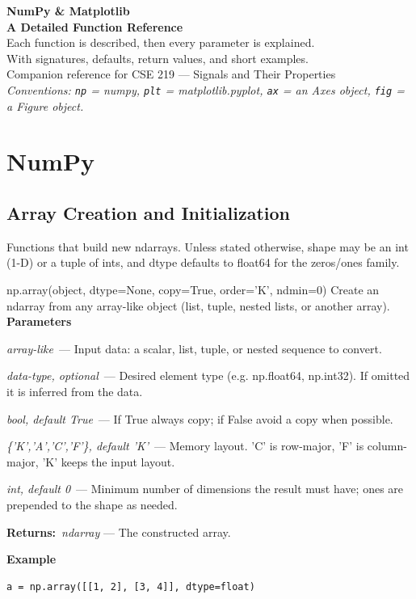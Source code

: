 \documentclass[10pt]{article}
\newenvironment{params}
  {\smallskip\textbf{\small\color{accent}Parameters}\par\nopagebreak
   \begin{description}[leftmargin=1.3em,itemsep=1.5pt,parsep=0pt,topsep=1pt,
      labelindent=0pt,style=sameline,font=\normalfont]}
  {\end{description}}
\newcommand{\pitem}[3]{\item[{\ttfamily\color{accent}#1}]{\itshape #2}\ --- #3}
\newcommand{\preturn}[2]{\smallskip\textbf{\small\color{accent}Returns:}\ {\itshape #1} --- #2\par}
\begin{document}
\begin{titlepage}
\centering
\vspace*{3cm}
{\Huge\bfseries\color{accent} NumPy \& Matplotlib}\\[6pt]
{\LARGE\bfseries A Detailed Function Reference}\\[10pt]
{\large Each function is described, then every parameter is explained.}\\[4pt]
{\normalsize With signatures, defaults, return values, and short examples.}\\[2cm]
{\small Companion reference for CSE 219 --- Signals and Their Properties}\\
\vfill
{\small\itshape Conventions: \texttt{np} = numpy, \texttt{plt} = matplotlib.pyplot,
\texttt{ax} = an Axes object, \texttt{fig} = a Figure object.}
\end{titlepage}

\tableofcontents
\clearpage

\section{NumPy}
\subsection{Array Creation and Initialization}
Functions that build new ndarrays. Unless stated otherwise, shape may be an int (1-D) or a tuple of ints, and dtype defaults to float64 for the zeros/ones family.

\begin{func}{np.array(object, dtype=None, copy=True, order='K', ndmin=0)}
Create an ndarray from any array-like object (list, tuple, nested lists, or another array).
\begin{params}
\pitem{object}{array-like}{Input data: a scalar, list, tuple, or nested sequence to convert.}
\pitem{dtype}{data-type, optional}{Desired element type (e.g. np.float64, np.int32). If omitted it is inferred from the data.}
\pitem{copy}{bool, default True}{If True always copy; if False avoid a copy when possible.}
\pitem{order}{\{'K','A','C','F'\}, default 'K'}{Memory layout. 'C' is row-major, 'F' is column-major, 'K' keeps the input layout.}
\pitem{ndmin}{int, default 0}{Minimum number of dimensions the result must have; ones are prepended to the shape as needed.}
\end{params}
\preturn{ndarray}{The constructed array.}
\smallskip\textbf{\small\color{accent}Example}
\begin{lstlisting}[style=py]
a = np.array([[1, 2], [3, 4]], dtype=float)
\end{lstlisting}
\end{func}
\medskip
\end{document}
